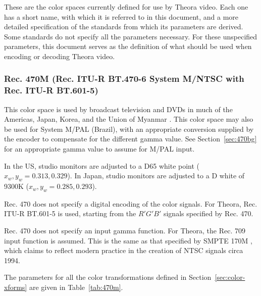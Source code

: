\documentclass[11pt,letterpaper]{article}
\begin{document}
These are the color spaces currently defined for use by Theora video.
Each one has a short name, with which it is referred to in this document, and
 a more detailed specification of the standards from which its parameters are
 derived.
Some standards do not specify all the parameters necessary.
For these unspecified parameters, this document serves as the definition of
 what should be used when encoding or decoding Theora video.

\subsubsection{Rec. 470M (Rec. ITU-R BT.470-6 System M/NTSC with Rec. ITU-R
 BT.601-5)}
\label{sec:470m}

This color space is used by broadcast television and DVDs in much of the
 Americas, Japan, Korea, and the Union of Myanmar \cite{rec470}.
This color space may also be used for System M/PAL (Brazil), with an
 appropriate conversion supplied by the encoder to compensate for the
 different gamma value.
See Section~\ref{sec:470bg} for an appropriate gamma value to assume for M/PAL
 input.

In the US, studio monitors are adjusted to a D65 white point
 ($x_w,y_w=0.313,0.329$).
In Japan, studio monitors are adjusted to a D white of 9300K
 ($x_w,y_w=0.285,0.293$).

Rec. 470 does not specify a digital encoding of the color signals.
For Theora, Rec. ITU-R BT.601-5 \cite{rec601} is used, starting from the
 $R'G'B'$ signals specified by Rec. 470.

Rec. 470 does not specify an input gamma function.
For Theora, the Rec. 709 \cite{rec709} input function is assumed.
This is the same as that specified by SMPTE 170M \cite{smpte170m}, which claims
 to reflect modern practice in the creation of NTSC signals circa 1994.

The parameters for all the color transformations defined in
 Section~\ref{sec:color-xforms} are given in Table~\ref{tab:470m}.
\end{document}
